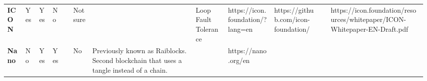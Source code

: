 \begin{table}[ht]
\begin{adjustbox}{width=25cm, height=6cm, angle=270}
\begin{tabular}{llllrlp{17.915em}rlrrr}
      \rowcolor[rgb]{ .267,  .447,  .769} \textcolor[rgb]{ 1,  1,  1}{\textbf{ICON}} & \cellcolor[rgb]{ .776,  .937,  .808}\textcolor[rgb]{ 0,  .38,  0}{Yes} & \cellcolor[rgb]{ .776,  .937,  .808}\textcolor[rgb]{ 0,  .38,  0}{Yes} & \cellcolor[rgb]{ 1,  .78,  .808}\textcolor[rgb]{ .612,  0,  .024}{No} & \cellcolor[rgb]{ 1,  1,  1}\textcolor[rgb]{ .188,  .329,  .588}{} & \cellcolor[rgb]{ 1,  .922,  .612}\textcolor[rgb]{ .612,  .341,  0}{Not sure} & \multicolumn{1}{r}{\cellcolor[rgb]{ 1,  1,  1}\textcolor[rgb]{ .188,  .329,  .588}{}} & \multicolumn{1}{l}{\cellcolor[rgb]{ 1,  1,  1}\textcolor[rgb]{ .188,  .329,  .588}{Loop Fault Tolerance}} & \cellcolor[rgb]{ 1,  1,  1}\textcolor[rgb]{ .188,  .329,  .588}{https://icon.foundation/?lang=en} & \multicolumn{1}{l}{\cellcolor[rgb]{ 1,  1,  1}\textcolor[rgb]{ .188,  .329,  .588}{https://github.com/icon-foundation/}} & \cellcolor[rgb]{ 1,  1,  1}\textcolor[rgb]{ .188,  .329,  .588}{} & \multicolumn{1}{l}{\cellcolor[rgb]{ 1,  1,  1}\textcolor[rgb]{ .188,  .329,  .588}{https://icon.foundation/resources/whitepaper/ICON-Whitepaper-EN-Draft.pdf}} \\
      \rowcolor[rgb]{ .267,  .447,  .769} \textcolor[rgb]{ 1,  1,  1}{\textbf{Nano}} & \cellcolor[rgb]{ 1,  .78,  .808}\textcolor[rgb]{ .612,  0,  .024}{No} & \cellcolor[rgb]{ .776,  .937,  .808}\textcolor[rgb]{ 0,  .38,  0}{Yes} & \cellcolor[rgb]{ .776,  .937,  .808}\textcolor[rgb]{ 0,  .38,  0}{Yes} & \cellcolor[rgb]{ 1,  1,  1}\textcolor[rgb]{ .188,  .329,  .588}{} & \cellcolor[rgb]{ 1,  .78,  .808}\textcolor[rgb]{ .612,  0,  .024}{No} & \cellcolor[rgb]{ .851,  .882,  .949}\textcolor[rgb]{ .188,  .329,  .588}{Previously known as Raiblocks. Second blockchain that uses a tangle instead of a chain.} & \cellcolor[rgb]{ 1,  1,  1}\textcolor[rgb]{ .188,  .329,  .588}{} & \cellcolor[rgb]{ 1,  1,  1}\textcolor[rgb]{ .188,  .329,  .588}{https://nano.org/en} & \cellcolor[rgb]{ 1,  1,  1}\textcolor[rgb]{ .188,  .329,  .588}{} & \cellcolor[rgb]{ 1,  1,  1}\textcolor[rgb]{ .188,  .329,  .588}{} & \cellcolor[rgb]{ 1,  1,  1}\textcolor[rgb]{ .188,  .329,  .588}{} \\
      \cmidrule{2-6}\cmidrule{8-12}    
    \end{tabular}
  \end{adjustbox}
  \label{bijlage_selectie_implementatie}
\end{table}



